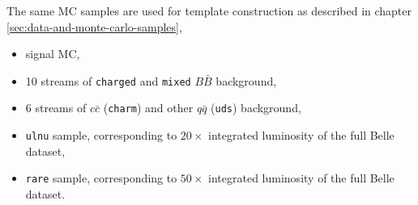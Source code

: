 The same MC samples are used for template construction as described in chapter \ref{sec:data-and-monte-carlo-samples},
\begin{itemize}
	\item signal MC,
	\item 10 streams of \texttt{charged} and \texttt{mixed} $B \bar B$ background,
	\item 6 streams of $c \bar c$ (\texttt{charm}) and other $q \bar q$ (\texttt{uds}) background,
	\item \texttt{ulnu} sample, corresponding to $20\times$ integrated luminosity of the full Belle dataset,
	\item \texttt{rare} sample, corresponding to $50\times$ integrated luminosity of the full Belle dataset.
\end{itemize}

